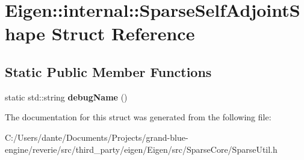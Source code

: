 \hypertarget{struct_eigen_1_1internal_1_1_sparse_self_adjoint_shape}{}\section{Eigen\+::internal\+::Sparse\+Self\+Adjoint\+Shape Struct Reference}
\label{struct_eigen_1_1internal_1_1_sparse_self_adjoint_shape}
\subsection*{Static Public Member Functions}
\begin{DoxyCompactItemize}
\item 
\mbox{\label{struct_eigen_1_1internal_1_1_sparse_self_adjoint_shape_a7216e466563d54a23ab198ea235513bd}} 
static std\+::string {\bfseries debug\+Name} ()
\end{DoxyCompactItemize}


The documentation for this struct was generated from the following file\+:\begin{DoxyCompactItemize}
\item 
C\+:/\+Users/dante/\+Documents/\+Projects/grand-\/blue-\/engine/reverie/src/third\+\_\+party/eigen/\+Eigen/src/\+Sparse\+Core/Sparse\+Util.\+h\end{DoxyCompactItemize}
